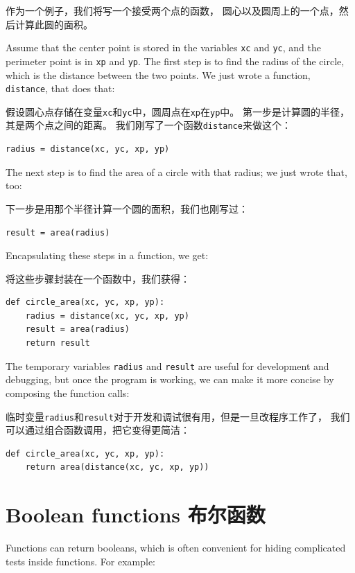 \documentclass[10pt]{book}
\begin{document}
\begin{CJK}{UTF8}{gbsn}
作为一个例子，我们将写一个接受两个点的函数，
圆心以及圆周上的一个点，然后计算此圆的面积。

Assume that the center point is stored in the variables {\tt xc} and
{\tt yc}, and the perimeter point is in {\tt xp} and {\tt yp}. The
first step is to find the radius of the circle, which is the distance
between the two points.  We just wrote a function, {\tt
distance}, that does that:

假设圆心点存储在变量{\tt xc}和{\tt yc}中，圆周点在{\tt xp}在{\tt yp}中。
第一步是计算圆的半径，其是两个点之间的距离。
我们刚写了一个函数{\tt distance}来做这个：

\begin{verbatim}
radius = distance(xc, yc, xp, yp)
\end{verbatim}
%
The next step is to find the area of a circle with that radius;
we just wrote that, too:

下一步是用那个半径计算一个圆的面积，我们也刚写过：

\begin{verbatim}
result = area(radius)
\end{verbatim}
%
Encapsulating these steps in a function, we get:

将这些步骤封装在一个函数中，我们获得：

\begin{verbatim}
def circle_area(xc, yc, xp, yp):
    radius = distance(xc, yc, xp, yp)
    result = area(radius)
    return result
\end{verbatim}
%
The temporary variables {\tt radius} and {\tt result} are useful for
development and debugging, but once the program is working, we can
make it more concise by composing the function calls:

临时变量{\tt radius}和{\tt result}对于开发和调试很有用，但是一旦改程序工作了，
我们可以通过组合函数调用，把它变得更简洁：

\begin{verbatim}
def circle_area(xc, yc, xp, yp):
    return area(distance(xc, yc, xp, yp))
\end{verbatim}
%

\section{Boolean functions 布尔函数}
\label{boolean}

Functions can return booleans, which is often convenient for hiding
complicated tests inside functions.  
For example:


\end{CJK}
\end{document}
